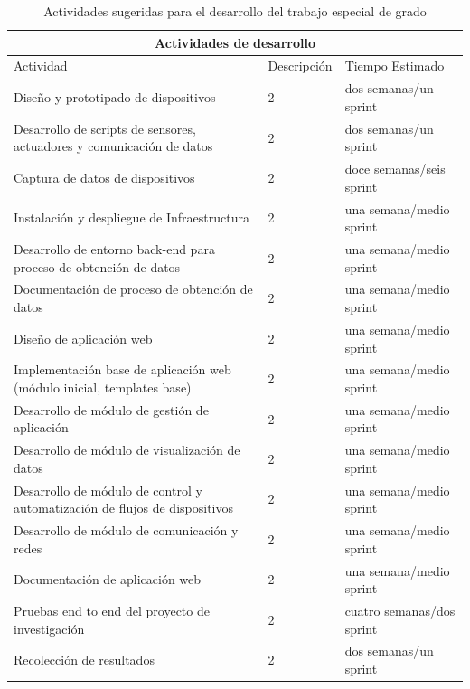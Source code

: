 \begin{table}[!htb]
\centering
\begin{tabular}{| m{4.5cm}| m{5cm}| m{4.5cm}|}
\hline
\multicolumn{3}{|c|}{Actividades de desarrollo} \\
\hline 
\centering Actividad & \centering Descripción & \centering Tiempo Estimado \tabularnewline \hline

Diseño y prototipado de dispositivos & 2 & dos semanas/un sprint \\ \hline

Desarrollo de scripts de sensores, actuadores y comunicación de datos & 2 & dos semanas/un sprint \\ \hline

Captura de datos de dispositivos & 2 & doce semanas/seis sprint \\ \hline

Instalación y despliegue de Infraestructura & 2 & una semana/medio sprint \\ \hline

Desarrollo de entorno back-end para proceso de obtención de datos & 2 & una semana/medio sprint  \\ \hline

Documentación de proceso de obtención de datos & 2 & una semana/medio sprint \\ \hline

Diseño de aplicación web & 2 & una semana/medio sprint \\ \hline

Implementación base de aplicación web (módulo inicial, templates base) & 2 & una semana/medio sprint \\ \hline

Desarrollo de módulo de gestión de aplicación & 2 & una semana/medio sprint \\ \hline

Desarrollo de módulo de visualización de datos & 2 & una semana/medio sprint \\ \hline

Desarrollo de módulo de control y automatización de flujos de dispositivos & 2 & una semana/medio sprint \\ \hline

Desarrollo de módulo de comunicación y redes & 2 & una semana/medio sprint \\ \hline

Documentación de aplicación web & 2 & una semana/medio sprint \\ \hline

Pruebas end to end del proyecto de investigación & 2 & cuatro semanas/dos sprint \\ \hline

Recolección de resultados & 2 & dos semanas/un sprint \\ \hline

\end{tabular}
\caption{Actividades sugeridas para el desarrollo del trabajo especial de grado}
\label{tabla:actividades_desarrollo}
\end{table}
 